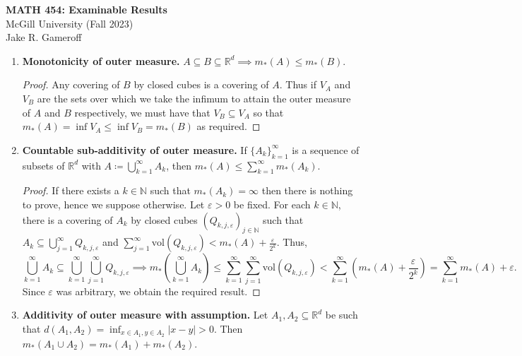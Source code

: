 
\usepackage{todonotes}


\begin{center}
	\textbf{\large MATH 454: Examinable Results} \\
    \large McGill University (Fall 2023)
    \\ Jake R. Gameroff 
\end{center}
\begin{enumerate}
	\item \textbf{Monotonicity of outer measure.} \( A \subseteq B \subseteq \mathbb{R}^{d} \implies m_*(A) \leq m_*(B).\) 
		\begin{proof}\renewcommand{\qedsymbol}{}
		Any covering of \( B \) by closed cubes is a covering of \( A \). Thus if \( V_A \) and \( V_B \) are the sets over which we take the infimum to attain the outer measure of \( A \) and \( B \) respectively, we must have that \( V_B \subseteq V_A \) so that \(m_*(A) = \inf V_A \leq \inf V_B = m_*(B) \) as required.
	        \end{proof}
	\item \textbf{Countable sub-additivity of outer measure.} If \( \{ A_k \}_{k=1} ^{\infty}  \) is a sequence of subsets of \( \mathbb{R}^{d}  \) with \(A \coloneqq \bigcup_{k=1}^{\infty} A_k \), then \( m_*(A) \leq \sum_{k=1}^{\infty}m_*(A_k)   \).
	\begin{proof}\renewcommand{\qedsymbol}{}
	If there exists a \( k \in \mathbb{N}  \) such that \( m_*(A_k) = \infty \) then there is nothing to prove, hence we suppose otherwise. Let \( \varepsilon > 0 \) be fixed. For each \( k \in \mathbb{N}  \), there is a covering of \( A_k \) by closed cubes \( (Q_{k,j,\varepsilon })_{j \in \mathbb{N} }   \) such that \( A_k \subseteq \bigcup_{j=1}^{\infty} Q_{k,j,\varepsilon }  \) and \( \sum_{j=1}^{\infty}\mbox{vol}(Q_{k,j,\varepsilon } ) < m_*(A) + \frac{\varepsilon }{2^{k} }  \). Thus, \[\bigcup_{k=1}^{\infty} A_k \subseteq \bigcup_{k=1}^{\infty} \bigcup_{j=1}^{\infty} Q_{k,j,\varepsilon } \implies m_*\left ( {\bigcup_{k=1}^{\infty} A_k} \right ) \leq \sum_{k=1}^{\infty}\sum_{j=1}^{\infty} \mbox{vol}(Q_{k,j,\varepsilon } ) < \sum_{k=1}^{\infty} \left(m_*(A) + \frac{\varepsilon }{2^{k} } \right)  = \sum_{k=1}^{\infty}m_*(A) + \varepsilon .  \] Since \( \varepsilon  \) was arbitrary, we obtain the required result.
\end{proof}
\item \textbf{Additivity of outer measure with assumption.} Let \( A_1, A_2 \subseteq \mathbb{R}^{d}  \) be such that \( d(A_1, A_2) = \inf_{x \in A_1, y \in A_2}|x-y|  > 0 \). Then \( m_*(A_1 \cup A_2) = m_*(A_1) + m_*(A_2)   \).

\end{enumerate}
